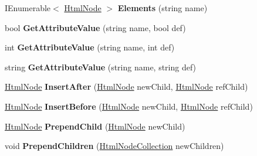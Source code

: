 \begin{DoxyCompactItemize}
I\+Enumerable$<$ \hyperlink{class_html_agility_pack_1_1_html_node}{Html\+Node} $>$ {\bfseries Elements} (string name)
\item 
\mbox{\label{class_html_agility_pack_1_1_html_node_a7c92c891c52dc9e5439ab7aa03a455b0}} 
bool {\bfseries Get\+Attribute\+Value} (string name, bool def)
\item 
\mbox{\label{class_html_agility_pack_1_1_html_node_a867a87ed04bc299e6ebd9012ec32b1f0}} 
int {\bfseries Get\+Attribute\+Value} (string name, int def)
\item 
\mbox{\label{class_html_agility_pack_1_1_html_node_aba043cb93effaa267479336fbc68d446}} 
string {\bfseries Get\+Attribute\+Value} (string name, string def)
\item 
\mbox{\label{class_html_agility_pack_1_1_html_node_ac81201c1243724141548c7981a70fb56}} 
\hyperlink{class_html_agility_pack_1_1_html_node}{Html\+Node} {\bfseries Insert\+After} (\hyperlink{class_html_agility_pack_1_1_html_node}{Html\+Node} new\+Child, \hyperlink{class_html_agility_pack_1_1_html_node}{Html\+Node} ref\+Child)
\item 
\mbox{\label{class_html_agility_pack_1_1_html_node_a7f42a331f6d29d079254604268e75f49}} 
\hyperlink{class_html_agility_pack_1_1_html_node}{Html\+Node} {\bfseries Insert\+Before} (\hyperlink{class_html_agility_pack_1_1_html_node}{Html\+Node} new\+Child, \hyperlink{class_html_agility_pack_1_1_html_node}{Html\+Node} ref\+Child)
\item 
\mbox{\label{class_html_agility_pack_1_1_html_node_a9319d4e8401526a1c22e3cf68591a647}} 
\hyperlink{class_html_agility_pack_1_1_html_node}{Html\+Node} {\bfseries Prepend\+Child} (\hyperlink{class_html_agility_pack_1_1_html_node}{Html\+Node} new\+Child)
\item 
\mbox{\label{class_html_agility_pack_1_1_html_node_a8baeef167ff771ed219dbb9e39518994}} 
void {\bfseries Prepend\+Children} (\hyperlink{class_html_agility_pack_1_1_html_node_collection}{Html\+Node\+Collection} new\+Children)

\end{DoxyCompactItemize}
